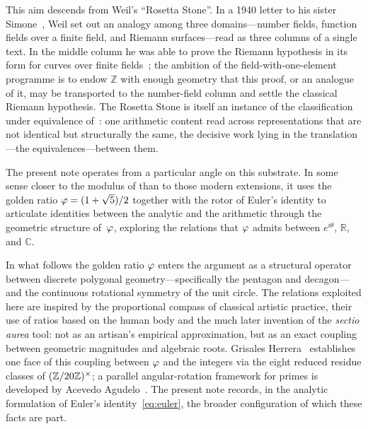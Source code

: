 This aim descends from Weil's ``Rosetta Stone''.  In a 1940 letter to his
sister Simone~\cite{weil-1940}, Weil set out an analogy among three
domains---number fields, function fields over a finite field, and Riemann
surfaces---read as three columns of a single text.  In the middle column he
was able to prove the Riemann hypothesis in its form for curves over finite
fields~\cite{weil-1948}; the ambition of the field-with-one-element
programme is to endow $\mathbb{Z}$ with enough geometry that this proof, or
an analogue of it, may be transported to the number-field column and settle
the classical Riemann hypothesis.  The Rosetta Stone is itself an instance
of the classification under equivalence of~: one
arithmetic content read across representations that are not identical but
structurally the same, the decisive work lying in the translation---the
equivalences---between them.

The present note operates from a particular angle on this substrate.
In some sense closer to the modulus of  than
to those modern
extensions, it uses the golden ratio $\varphi=(1+\sqrt{5})/2$
together with the rotor of Euler's identity to articulate identities
between the analytic and the arithmetic through the geometric
structure of~$\varphi$, exploring the relations that $\varphi$
admits between $e^{i\theta}$, $\mathbb{R}$, and $\mathbb{C}$.

In what follows the golden ratio $\varphi$ enters the argument as a
structural operator between discrete polygonal geometry---specifically
the pentagon and decagon---and the continuous rotational symmetry of
the unit circle.  The relations exploited here are inspired by the
proportional compass of classical artistic practice, their use of
ratios based on the human body and the much later invention of the
\emph{sectio aurea} tool: not as an artisan's empirical
approximation, but as an exact coupling between geometric magnitudes
and algebraic roots.  Grisales Herrera~\cite{grisales} establishes
one face of this coupling between $\varphi$ and the integers via the
eight reduced residue classes of $(\mathbb{Z}/20\mathbb{Z})^{\times}$; a parallel
angular-rotation framework for primes is developed by Acevedo
Agudelo~\cite{acevedo-2021}.  The present note records, in the
analytic formulation of Euler's identity~\eqref{eq:euler}, the
broader configuration of which these facts are part.


